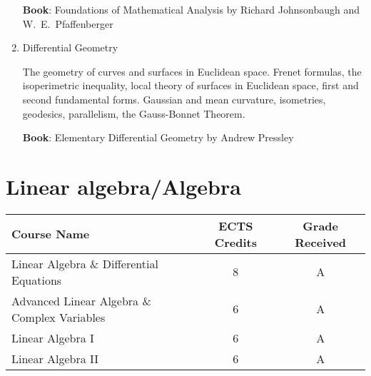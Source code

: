 \documentclass[11pt]{article}
\begin{document}
\begin{enumerate}
    \textbf{Book}: Foundations of Mathematical Analysis by Richard Johnsonbaugh and W.\ E.\ Pfaffenberger

    \item Differential Geometry
    
    The geometry of curves and surfaces in Euclidean space. Frenet formulas, the isoperimetric inequality, local theory of surfaces in Euclidean space, first and second fundamental forms. Gaussian and mean curvature, isometries, geodesics, parallelism, the Gauss-Bonnet Theorem.
    
    \textbf{Book}: Elementary Differential Geometry by Andrew Pressley
\end{enumerate}

\section*{Linear algebra/Algebra}

\begin{center}
\begin{tabular}{lcc}
Course Name & ECTS Credits & Grade Received \\ \toprule
Linear Algebra \& Differential Equations & 8 & A \\
Advanced Linear Algebra \& Complex Variables & 6 & A \\
Linear Algebra I & 6 & A \\
Linear Algebra II & 6 & A
\end{tabular}
\end{center}
\end{document}
